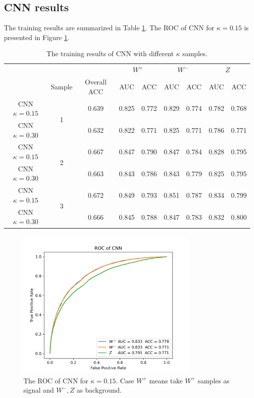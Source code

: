 \documentclass[12pt]{article}
\begin{document}
	\subsection{CNN results}%
	\label{sub:cnn_results}
		The training results are summarized in Table \ref{tab:CNN_training_result}. The ROC of CNN for $\kappa = 0.15$ is presented in Figure \ref{fig:CNN_of_BDT}.
		\begin{table}[htpb]
			\centering
			\caption{The training results of CNN with different $\kappa$ samples.}
			\label{tab:CNN_training_result}
			\begin{tabular}{c|c|c|cc|cc|cc}
								  &					  &             & \multicolumn{2}{c|}{$W^{+}$} & \multicolumn{2}{c|}{$W^{-}$} & \multicolumn{2}{c}{$Z$} \\
								  & Sample			  & Overall ACC & AUC        & ACC       & AUC        & ACC       & AUC       & ACC       \\ \hline
				CNN $\kappa=0.15$ & \multirow{2}{*}{1}& 0.639 & 0.825 & 0.772 & 0.829 & 0.774 & 0.782 & 0.768 \\
				CNN $\kappa=0.30$ &					  & 0.632 & 0.822 & 0.771 & 0.825 & 0.771 & 0.786 & 0.771 \\ \hline
				CNN $\kappa=0.15$ & \multirow{2}{*}{2}& 0.667 & 0.847 & 0.790 & 0.847 & 0.784 & 0.828 & 0.795 \\
				CNN $\kappa=0.30$ &					  & 0.663 & 0.843 & 0.786 & 0.843 & 0.779 & 0.825 & 0.795 \\ \hline
				CNN $\kappa=0.15$ & \multirow{2}{*}{3}& 0.672 & 0.849 & 0.793 & 0.851 & 0.787 & 0.834 & 0.799 \\
				CNN $\kappa=0.30$ &					  & 0.666 & 0.845 & 0.788 & 0.847 & 0.783 & 0.832 & 0.800 \\
			\end{tabular}
		\end{table}	
		\begin{figure}[htpb]
			\centering
			\includegraphics[width=0.8\textwidth]{ROC_CNN.png}
			\caption{The ROC of CNN for $\kappa = 0.15$. Case $W^{+}$ means take $W^{+}$ samples as signal and $W^{-}, Z$ as background.}
			\label{fig:CNN_of_BDT}
		\end{figure}
		
\end{document}
